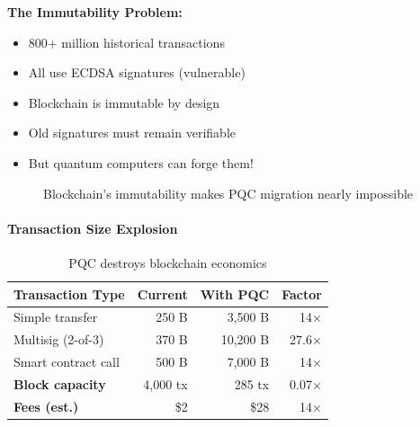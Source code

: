 \documentclass[11pt,a4paper]{article}
\begin{document}
\textbf{The Immutability Problem:}
\begin{itemize}
    \item 800+ million historical transactions
    \item All use ECDSA signatures (vulnerable)
    \item Blockchain is immutable by design
    \item Old signatures must remain verifiable
    \item But quantum computers can forge them!
\end{itemize}

\begin{figure}[h]
\centering
{}
\caption{Blockchain's immutability makes PQC migration nearly impossible}
\end{figure}

\paragraph{Transaction Size Explosion}

\begin{table}[h]
\centering
\begin{tabular}{|l|r|r|r|}
\hline
\textbf{Transaction Type} & \textbf{Current} & \textbf{With PQC} & \textbf{Factor} \\
\hline
Simple transfer & 250 B & 3,500 B & 14× \\
Multisig (2-of-3) & 370 B & 10,200 B & 27.6× \\
Smart contract call & 500 B & 7,000 B & 14× \\
\hline
\textbf{Block capacity} & 4,000 tx & 285 tx & 0.07× \\
\textbf{Fees (est.)} & \$2 & \$28 & 14× \\
\hline
\end{tabular}
\caption{PQC destroys blockchain economics}
\end{table}
\end{document}
